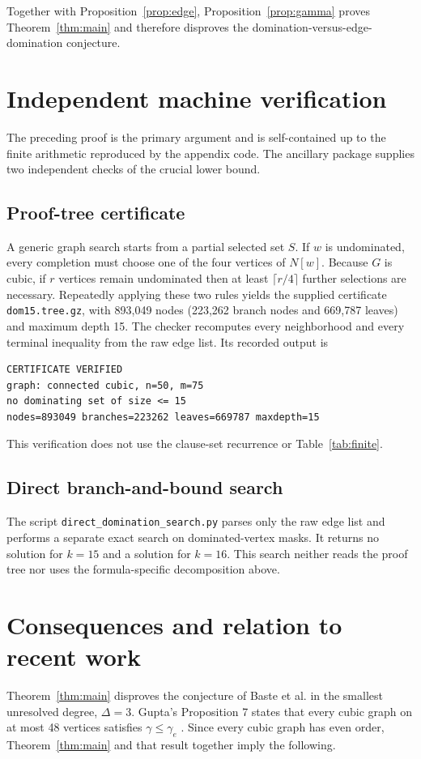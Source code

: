\documentclass[11pt]{article}
\theoremstyle{definition}
\theoremstyle{remark}
\begin{document}
Together with Proposition~\ref{prop:edge}, Proposition~\ref{prop:gamma} proves Theorem~\ref{thm:main} and therefore disproves the domination-versus-edge-domination conjecture.

\section{Independent machine verification}\label{sec:verification}
The preceding proof is the primary argument and is self-contained up to the finite arithmetic reproduced by the appendix code.  The ancillary package supplies two independent checks of the crucial lower bound.

\subsection{Proof-tree certificate}
A generic graph search starts from a partial selected set \(S\).  If \(w\) is undominated, every completion must choose one of the four vertices of \(N[w]\).  Because \(G\) is cubic, if \(r\) vertices remain undominated then at least \(\lceil r/4\rceil\) further selections are necessary.  Repeatedly applying these two rules yields the supplied certificate \texttt{dom15.tree.gz}, with 893,049 nodes (223,262 branch nodes and 669,787 leaves) and maximum depth 15.  The checker recomputes every neighborhood and every terminal inequality from the raw edge list.  Its recorded output is
\begin{verbatim}
CERTIFICATE VERIFIED
graph: connected cubic, n=50, m=75
no dominating set of size <= 15
nodes=893049 branches=223262 leaves=669787 maxdepth=15
\end{verbatim}
This verification does not use the clause-set recurrence or Table~\ref{tab:finite}.

\subsection{Direct branch-and-bound search}
The script \texttt{direct\_domination\_search.py} parses only the raw edge list and performs a separate exact search on dominated-vertex masks.  It returns no solution for \(k=15\) and a solution for \(k=16\).  This search neither reads the proof tree nor uses the formula-specific decomposition above.

\section{Consequences and relation to recent work}
Theorem~\ref{thm:main} disproves the conjecture of Baste et al. in the smallest unresolved degree, \(\Delta=3\).  Gupta's Proposition 7 states that every cubic graph on at most 48 vertices satisfies \(\gamma\leq\gamma_e\) \cite{Gupta2026}.  Since every cubic graph has even order, Theorem~\ref{thm:main} and that result together imply the following.
\end{document}
